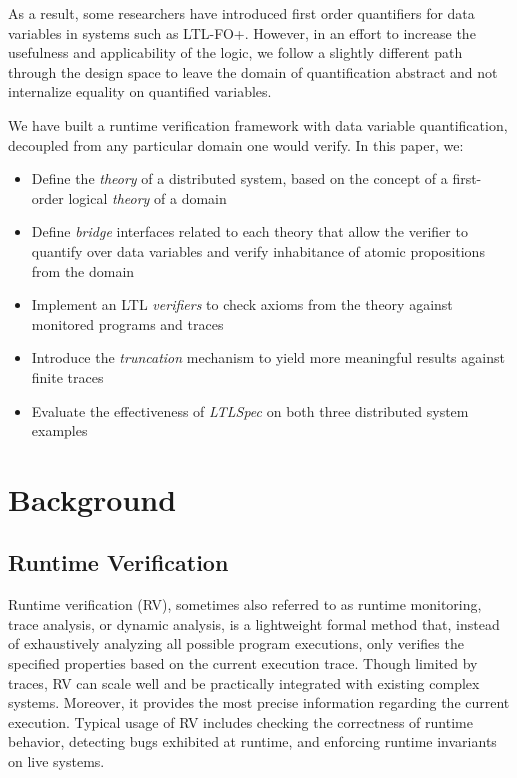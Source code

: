 \documentclass[format=acmsmall, nonacm=true, review=true, screen=true]{acmart}
\newcommand{\ltlspec}{\textit{LTLSpec}\xspace}
\begin{document}
As a result, some researchers have introduced first order quantifiers for data variables \cite{khoury_automata-based_2021,margaria_execution_2016,halle_runtime_2012} in systems such as LTL-FO+.
However, in an effort to increase the usefulness and applicability of the logic, we follow a slightly different path through the design space to leave the domain of quantification abstract and not internalize equality on quantified variables.

We have built a runtime verification framework with data variable quantification, decoupled from any particular domain one would verify.
In this paper, we:
\begin{itemize}
  \item Define the \textit{theory} of a distributed system, based on the concept of a first-order logical \textit{theory} of a domain
  \item Define \textit{bridge} interfaces related to each theory that allow the verifier to quantify over data variables and verify inhabitance of atomic propositions from the domain
  \item Implement an LTL \textit{verifiers} to check axioms from the theory against monitored programs and traces
  \item Introduce the \textit{truncation} mechanism to yield more meaningful results against finite traces
  \item Evaluate the effectiveness of \ltlspec on both three distributed system examples
\end{itemize}

\section{Background}
\subsection{Runtime Verification}
Runtime verification (RV), sometimes also referred to as runtime monitoring, trace analysis, or dynamic analysis, is a lightweight formal method that, instead of exhaustively analyzing all possible program executions, only verifies the specified properties based on the current execution trace. Though limited by traces, RV can scale well and be practically integrated with existing complex systems. Moreover, it provides the most precise information regarding the current execution. Typical usage of RV includes checking the correctness of runtime behavior, detecting bugs exhibited at runtime, and enforcing runtime invariants on live systems.
\end{document}
